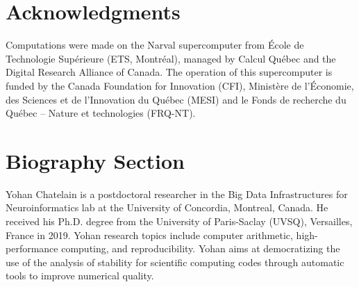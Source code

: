\documentclass[lettersize,journal]{IEEEtran}
\begin{document}
{\section*{Acknowledgments}

Computations were made on the Narval supercomputer from \'Ecole de Technologie
Sup\'erieure (ETS, Montr\'eal), managed by Calcul Québec and the Digital Research Alliance of Canada. The
operation of this supercomputer is funded by the Canada Foundation for
Innovation (CFI), Ministère de l’Économie, des Sciences et de l’Innovation du
Québec (MESI) and le Fonds de recherche du Québec – Nature et technologies
(FRQ-NT).





\newpage

\section{Biography Section}

\vspace{11pt}


\begin{IEEEbiography}{Yohan Chatelain}
  is a postdoctoral researcher in the
  Big Data Infrastructures for Neuroinformatics lab at the University of
  Concordia, Montreal, Canada.
  He received his Ph.D. degree from the University of Paris-Saclay
  (UVSQ), Versailles, France in 2019. Yohan research topics include computer
  arithmetic, high-performance computing, and reproducibility. Yohan aims at
  democratizing the use of the analysis of stability for scientific computing
  codes through automatic tools to improve numerical quality.
\end{IEEEbiography}

}
\end{document}
